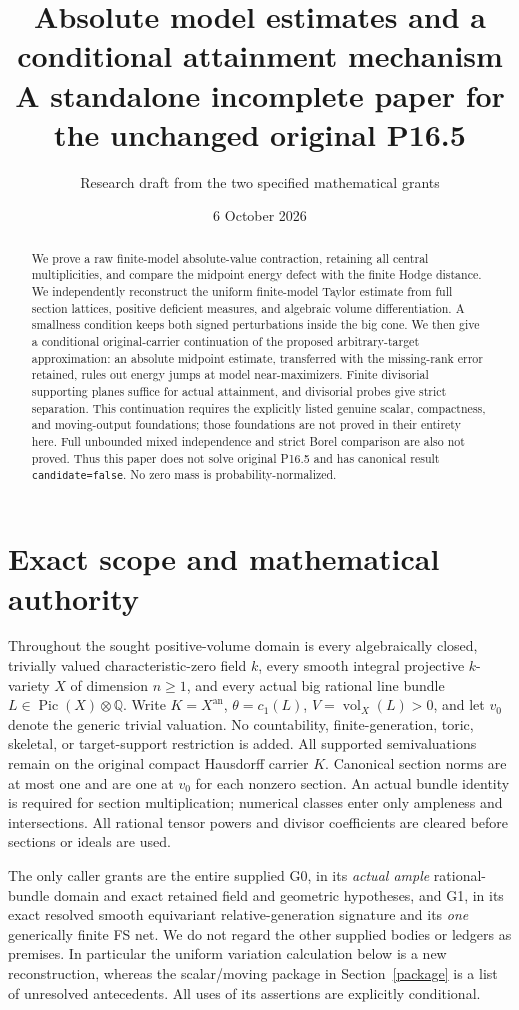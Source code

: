 \documentclass[10pt]{article}
\title{Absolute model estimates and a conditional attainment mechanism\\
\large A standalone incomplete paper for the unchanged original P16.5}
\author{Research draft from the two specified mathematical grants}
\date{6 October 2026}
\newcommand{\vol}{\operatorname{vol}}
\newcommand{\an}{\mathrm{an}}
\begin{document}
\maketitle
\begin{abstract}
We prove a raw finite-model absolute-value contraction, retaining all central
multiplicities, and compare the midpoint energy defect with the finite Hodge
distance. We independently reconstruct the uniform finite-model Taylor
estimate from full section lattices, positive deficient measures, and algebraic
volume differentiation. A smallness condition keeps both signed perturbations
inside the big cone. We then give a conditional original-carrier continuation
of the proposed arbitrary-target approximation: an absolute midpoint estimate,
transferred with the missing-rank error retained, rules out energy jumps at
model near-maximizers. Finite divisorial supporting planes suffice for actual
attainment, and divisorial probes give strict separation. This continuation
requires the explicitly listed genuine scalar, compactness, and moving-output
foundations; those foundations are not proved in their entirety here. Full
unbounded mixed independence and strict Borel comparison are also not proved.
Thus this paper does not solve original P16.5 and has canonical result
\texttt{candidate=false}. No zero mass is probability-normalized.
\end{abstract}

\section{Exact scope and mathematical authority}
Throughout the sought positive-volume domain is every algebraically closed,
trivially valued characteristic-zero field $k$, every smooth integral
projective $k$-variety $X$ of dimension $n\geq1$, and every actual big rational
line bundle $L\in\operatorname{Pic}(X)\otimes\mathbb Q$.
Write $K=X^\an$, $\theta=c_1(L)$, $V=\vol_X(L)>0$, and let $v_0$ denote
the generic trivial valuation. No countability, finite-generation, toric,
skeletal, or target-support restriction is added. All supported semivaluations
remain on the original compact Hausdorff carrier $K$. Canonical section norms
are at most one and are one at $v_0$ for each nonzero section.
An actual bundle identity is required for section multiplication; numerical
classes enter only ampleness and intersections. All rational tensor powers
and divisor coefficients are cleared before sections or ideals are used.

The only caller grants are the entire supplied G0, in its \emph{actual ample}
rational-bundle domain and exact retained field and geometric hypotheses,
and G1, in its exact resolved smooth equivariant relative-generation signature
and its \emph{one} generically finite FS net. We do not regard the other supplied
bodies or ledgers as premises. In particular the uniform variation calculation
below is a new reconstruction, whereas the scalar/moving package in
Section~\ref{package} is a list of unresolved antecedents. All uses of its
assertions are explicitly conditional.
\end{document}
